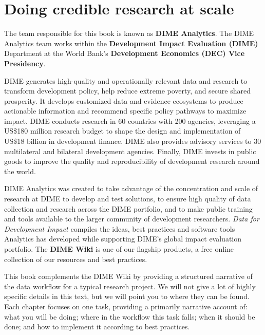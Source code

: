 
\section{Doing credible research at scale}

The team responsible for this book is known as \textbf{DIME Analytics}.
The DIME Analytics team works within the \textbf{Development Impact Evaluation (DIME)} Department
at the World Bank's \textbf{Development Economics (DEC) Vice Presidency}.

DIME generates high-quality and operationally relevant data and research 
to transform development policy, help reduce extreme poverty, and secure shared prosperity. 
It develops customized data and evidence ecosystems to produce actionable information 
and recommend specific policy pathways to maximize impact.
DIME conducts research in 60 countries with 200 agencies, leveraging a 
US\$180 million research budget to shape the design and implementation of 
US\$18 billion in development finance. 
DIME also provides advisory services to 30 multilateral and bilateral development agencies. 
Finally, DIME invests in public goods to improve the quality and reproducibility of development research around the world. 

DIME Analytics was created to take advantage of the concentration and scale of research at DIME to develop and test solutions, 
to ensure high quality of data collection and research across the DIME portfolio, 
and to make public training and tools available to the larger community of development researchers.
\textit{Data for Development Impact} compiles the ideas, best practices and software tools Analytics 
has developed while supporting DIME's global impact evaluation portfolio. 
The \textbf{DIME Wiki} is one of our flagship products, a free online collection of our resources and best practices.

This book complements the DIME Wiki by providing a structured narrative of the data workflow for a typical research project. 
We will not give a lot of highly specific details in this text,
but we will point you to where they can be found.
Each chapter focuses on one task, providing a primarily narrative account of:
what you will be doing; where in the workflow this task falls;
when it should be done; and how to implement it according to best practices.



